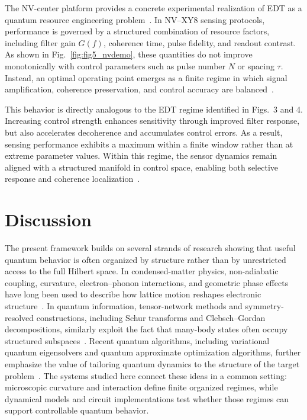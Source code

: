 \documentclass[twocolumn,10pt]{article}
\begin{document}
The NV-center platform provides a concrete experimental realization of EDT as a quantum resource engineering problem~\cite{Degen2017,Barry2020}. In NV--XY8 sensing protocols, performance is governed by a structured combination of resource factors, including filter gain $G(f)$, coherence time, pulse fidelity, and readout contrast. As shown in Fig.~\ref{fig:fig5_nvdemo}, these quantities do not improve monotonically with control parameters such as pulse number $N$ or spacing $\tau$. Instead, an optimal operating point emerges as a finite regime in which signal amplification, coherence preservation, and control accuracy are balanced~\cite{Casola2018}.

This behavior is directly analogous to the EDT regime identified in Figs.~3 and 4. Increasing control strength enhances sensitivity through improved filter response, but also accelerates decoherence and accumulates control errors. As a result, sensing performance exhibits a maximum within a finite window rather than at extreme parameter values. Within this regime, the sensor dynamics remain aligned with a structured manifold in control space, enabling both selective response and coherence localization~\cite{Degen2017,Barry2020}.

\section*{Discussion}

The present framework builds on several strands of research showing that useful quantum behavior is often organized by structure rather than by unrestricted access to the full Hilbert space. In condensed-matter physics, non-adiabatic coupling, curvature, electron--phonon interactions, and geometric phase effects have long been used to describe how lattice motion reshapes electronic structure~\cite{Mead1979,Yarkony1996,Giustino2017}. In quantum information, tensor-network methods and symmetry-resolved constructions, including Schur transforms and Clebsch--Gordan decompositions, similarly exploit the fact that many-body states often occupy structured subspaces~\cite{Schollwock2011,Bacon2006}. Recent quantum algorithms, including variational quantum eigensolvers and quantum approximate optimization algorithms, further emphasize the value of tailoring quantum dynamics to the structure of the target problem~\cite{Peruzzo2014,Farhi2014}. The systems studied here connect these ideas in a common setting: microscopic curvature and interaction define finite organized regimes, while dynamical models and circuit implementations test whether those regimes can support controllable quantum behavior.
\end{document}
